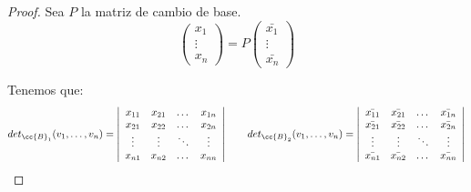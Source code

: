 \begin{proof}
    Sea $P$ la matriz de cambio de base.
    \begin{equation*}
        \left(\begin{array}{c}
        x_1 \\ \vdots \\ x_n
    \end{array}\right) = P\left(\begin{array}{c}
        \bar{x_1} \\ \vdots \\ \bar{x_n}
    \end{array}\right)
    \end{equation*}

    Tenemos que:
    \begin{equation*}
        det_{\cc{B}_1} (v_1,\dots,v_n) = \left|\begin{array}{cccc}
            x_{11} & x_{21} & \dots & x_{1n} \\
            x_{21} & x_{22} & \dots & x_{2n} \\
            \vdots & \vdots & \ddots & \vdots \\
            x_{n1} & x_{n2} & \dots & x_{nn} \\
        \end{array}\right|
        \qquad
        det_{\cc{B}_2} (v_1,\dots,v_n) = \left|\begin{array}{cccc}
            \bar{x_{11}} & \bar{x_{21}} & \dots & \bar{x_{1n}} \\
            \bar{x_{21}} & \bar{x_{22}} & \dots & \bar{x_{2n}} \\
            \vdots & \vdots & \ddots & \vdots \\
            \bar{x_{n1}} & \bar{x_{n2}} & \dots & \bar{x_{nn}} \\
        \end{array}\right|
    \end{equation*}


\end{proof}
